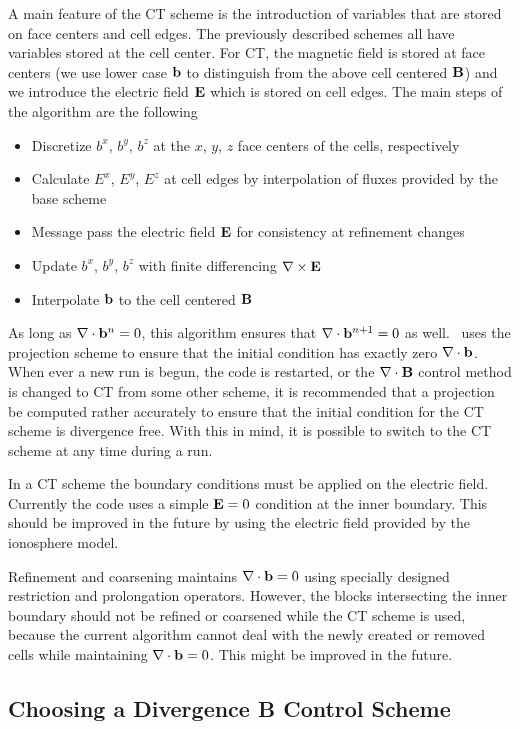 A main feature of the CT scheme is the introduction of variables that
are stored on face centers and cell edges.  The previously described 
schemes all have  variables stored at the cell center.  For CT, the magnetic 
field is
stored at face centers (we use lower case $\bf b$ to distinguish from the
above cell centered $\bf B$) and we introduce the electric field $\bf E$
which is stored on cell edges.
The main steps of the algorithm are the following
\begin{itemize}\itemsep=0pt
\item Discretize $b^x$, $b^y$, $b^z$ at the $x$, $y$, $z$
             face centers of the cells, respectively
\item Calculate $E^x$, $E^y$, $E^z$ at cell edges by interpolation
      of fluxes provided by the base scheme
\item Message pass the electric field $\mathbf{E}$ for consistency at refinement
      changes
\item Update $b^x$, $b^y$, $b^z$ with finite differencing $\nabla\times\mathbf{E}$
\item Interpolate $\mathbf{b}$ to the cell centered $\mathbf{B}$
\end{itemize}

As long as $\nabla\cdot\mathbf{b}^n=0$, this algorithm ensures that $\nabla\cdot\mathbf{b}^{n+1}=0$ as well.
\BATSRUS\ uses the projection scheme to ensure that the initial condition
has exactly zero $\nabla\cdot\mathbf{b}$. 
When ever a new run is begun, the code is restarted, or the $\nabla\cdot\mathbf{B}$ control
method is changed to CT from some other scheme, it is recommended that 
a projection
be computed rather accurately to ensure that the initial condition for the CT
scheme is divergence free.  With this in mind, it is possible to switch to the 
CT scheme at any time during a run.

In a CT scheme the boundary conditions must be applied on the electric
field. Currently the code uses a simple $\mathbf{E}=0$ condition at the inner
boundary. This should be improved in the future by using the electric
field provided by the ionosphere model.

Refinement and coarsening maintains $\nabla\cdot\mathbf{b}=0$ using specially designed
restriction and prolongation operators. However, the blocks intersecting
the inner boundary should not be refined or coarsened while the CT scheme
is used, because the current algorithm cannot deal with the newly
created or removed cells while maintaining $\nabla\cdot\mathbf{b}=0$. This might be
improved in the future.

\subsection{Choosing a Divergence B Control Scheme \label{section:choosing_divb_control}}

